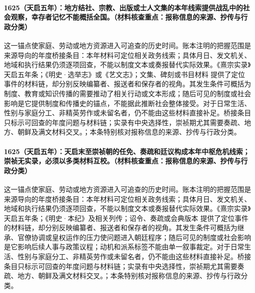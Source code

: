 \paragraph{1625（天启五年）：地方结社、宗教、出版或士人文集的本年线索提供战乱中的社会观察，幸存者记忆不能概括全国。（材料核查重点：报称信息的来源、抄传与行政分类）} 这一锚点使家庭、劳动或地方资源进入可追查的历史时间。账本注明的把握范围是来源导向的年度桥接条目：本年材料可定位相关政务线索；具体月日、发文机关、地域和执行结果仍须逐项回查，不能以制度文本或奏报替代实际效果。《熹宗实录》天启五年条；《明史·选举志》或《艺文志》；文集、碑刻或书目材料 提供了定位事件的材料链，却分别反映编纂者、报送者和保存者的视角。其发生条件可概括为制度、教育或知识传播的需要推动了相关行动或文本形成；随后可见的制度或社会影响是它提供制度和传播史的锚点，不能据此推断社会整体接受。对于日常生活、性别与家庭分工、非精英劳作或未留名者，仍不能由这些材料直接补足。桥接条目只标示可回查的年度问题与材料链；实录有中央选择性，崇祯期尤其需要奏疏、地方、朝鲜及满文材料交叉。；本条特别核对报称信息的来源、抄传与行政分类。

\paragraph{1625（天启五年）：天启末至崇祯朝的任免、奏疏和廷议构成本年中枢危机线索；崇祯无实录，必须以多类材料互校。（材料核查重点：报称信息的来源、抄传与行政分类）} 这一锚点使家庭、劳动或地方资源进入可追查的历史时间。账本注明的把握范围是来源导向的年度桥接条目：本年材料可定位相关政务线索；具体月日、发文机关、地域和执行结果仍须逐项回查，不能以制度文本或奏报替代实际效果。《熹宗实录》天启五年条；《明史·本纪》及相关列传；诏令、奏疏或会典版本 提供了定位事件的材料链，却分别反映编纂者、报送者和保存者的视角。其发生条件可概括为继承、官僚协调或皇权运作的压力使问题进入朝廷程序；随后可见的制度或社会影响是它影响后续人事与政策议程；动机和派系标签不能由单一叙事裁定。对于日常生活、性别与家庭分工、非精英劳作或未留名者，仍不能由这些材料直接补足。桥接条目只标示可回查的年度问题与材料链；实录有中央选择性，崇祯期尤其需要奏疏、地方、朝鲜及满文材料交叉。；本条特别核对报称信息的来源、抄传与行政分类。

